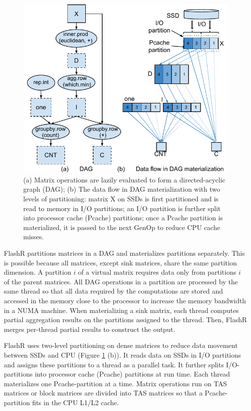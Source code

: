 \begin{figure}
	\centering
	\includegraphics[scale=0.6]{FlashMatrix_figs/kmeans.pdf}
  \vspace{-4pt}
	\caption{(a) Matrix operations are lazily evaluated to form
	a directed-acyclic graph (DAG); (b) The data flow in DAG materialization
	with two levels of partitioning: matrix X on SSDs is first partitioned
	and is read to memory in I/O partitions; an I/O partition is further
	split into processor cache (Pcache) partitions; once a Pcache partition
	is materialized, it is passed to the next GenOp to reduce CPU cache misses. }
	\label{fig:dag}
  \vspace{-8pt}
\end{figure}

FlashR partitions matrices in a DAG and materializes partitions separately.
This is possible because all matrices, except
sink matrices, share the same partition dimension. 
A partition $i$ of a virtual matrix requires data only from partitions
$i$ of the parent matrices.  All DAG operations in a partition are processed by 
the same thread so that all data required by the computations are stored and
accessed in the memory close to the processor to increase the memory bandwidth
in a NUMA machine.
When materializing a sink matrix, each thread computes partial
aggregation results on the partitions assigned to the thread. 
Then, FlashR merges per-thread partial results to construct the output.

FlashR uses two-level partitioning on dense matrices to reduce data movement
between SSDs and CPU (Figure \ref{fig:dag} (b)). It reads data on SSDs in
I/O partitions and assigns these partitions to a thread as a parallel task.
It further splits I/O-partitions into processor cache (Pcache)
partitions at run time.  Each thread materializes one Pcache-partition
at a time. Matrix operations run on TAS matrices or block matrices are
divided into TAS matrices so that a Pcache-partition fits in the CPU L1/L2 cache.

